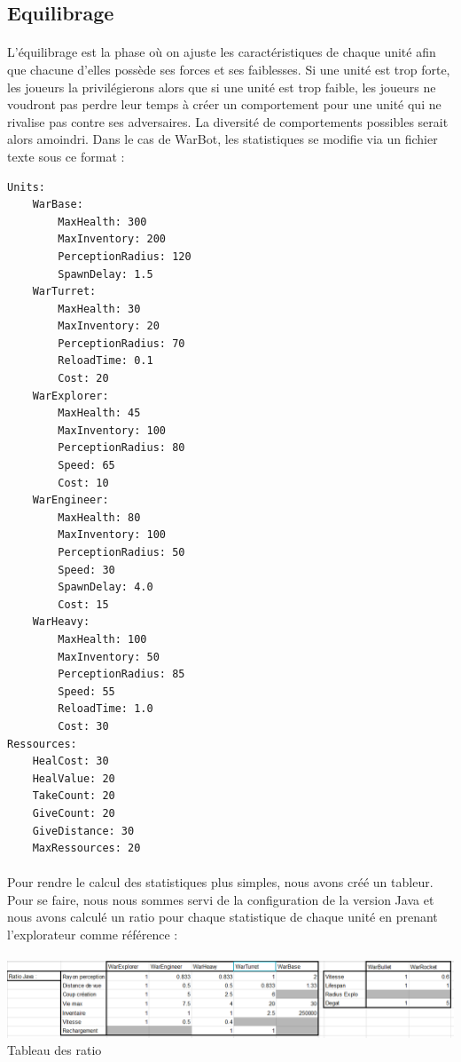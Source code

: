 \documentclass{report}
\begin{document}
\subsection{Equilibrage}
\paragraph{}
    L’équilibrage est la phase où on ajuste les caractéristiques de chaque unité afin que chacune d’elles possède ses forces et ses faiblesses. Si une unité est trop forte, les joueurs la privilégierons alors que si une unité est trop faible, les joueurs ne voudront pas perdre leur temps à créer un comportement pour une unité qui ne rivalise pas contre ses adversaires. La diversité de comportements possibles serait alors amoindri. \newline
    Dans le cas de WarBot, les statistiques se modifie via un fichier texte sous ce format :
\begin{lstlisting}[frame=single]
Units:
    WarBase:
        MaxHealth: 300
        MaxInventory: 200
        PerceptionRadius: 120
        SpawnDelay: 1.5
    WarTurret:
        MaxHealth: 30
        MaxInventory: 20
        PerceptionRadius: 70
        ReloadTime: 0.1
        Cost: 20
    WarExplorer:
        MaxHealth: 45
        MaxInventory: 100
        PerceptionRadius: 80
        Speed: 65
        Cost: 10
    WarEngineer:
        MaxHealth: 80
        MaxInventory: 100
        PerceptionRadius: 50
        Speed: 30
        SpawnDelay: 4.0
        Cost: 15
    WarHeavy:
        MaxHealth: 100
        MaxInventory: 50
        PerceptionRadius: 85
        Speed: 55
        ReloadTime: 1.0
        Cost: 30
Ressources:
    HealCost: 30
    HealValue: 20
    TakeCount: 20
    GiveCount: 20
    GiveDistance: 30
    MaxRessources: 20
\end{lstlisting}
\paragraph{}
Pour rendre le calcul des statistiques plus simples, nous avons créé un tableur. Pour se faire, nous nous sommes servi de la configuration de la version Java et nous avons calculé un ratio pour chaque statistique de chaque unité en prenant l’explorateur comme référence :

\paragraph{}
\begin{adjustwidth}{-3em}{}
\includegraphics[scale=0.5]{DATA/ratio.png}
 {Tableau des ratio}
\end{adjustwidth}
\end{document}
